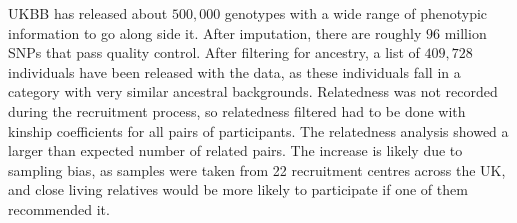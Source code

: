 UKBB has released about $ 500,000 $ genotypes with a wide range of phenotypic information to go along side it. After imputation, there are roughly $ 96 $ million SNPs that pass quality control. After filtering for ancestry, a list of $ 409,728 $ individuals have been released with the data, as these individuals fall in a category with very similar ancestral backgrounds. Relatedness was not recorded during the recruitment process, so relatedness filtered had to be done with kinship coefficients for all pairs of participants. The relatedness analysis showed a larger than expected number of related pairs. The increase is likely due to sampling bias, as samples were taken from 22 recruitment centres across the UK, and close living relatives would be more likely to participate if one of them recommended it. \cite{bycroft2018uk,biobank2015genotyping}

